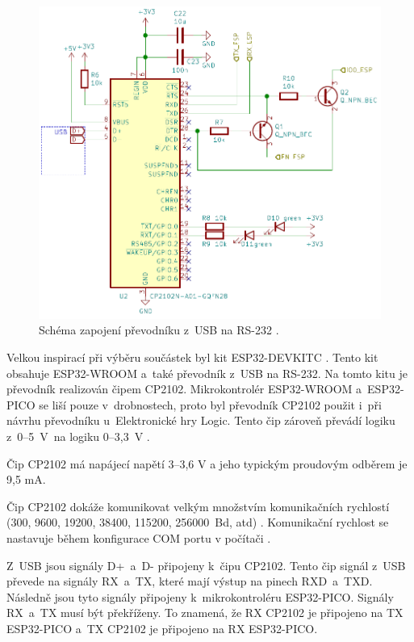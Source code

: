   \begin{figure}[!h]
    \begin{center}
      \includegraphics[scale=0.55]{obrazky/CP2102_schema.png}
    \end{center}
    \caption[Schéma zapojení převodníku z~USB na RS-232 \cite{Devkit_schema}]{Schéma zapojení převodníku z~USB na RS-232 \cite{Devkit_schema}.}
  \end{figure}

  Velkou inspirací při výběru součástek byl kit ESP32-DEVKITC \cite{Devkit_schema}. Tento kit obsahuje ESP32-WROOM a~také převodník
  z~USB na RS-232. Na tomto kitu je převodník realizován čipem CP2102. Mikrokontrolér ESP32-WROOM a~ESP32-PICO se liší pouze v~drobnostech, 
  proto byl převodník CP2102 použit i~při návrhu převodníku u~Elektronické hry Logic.  Tento čip zároveň převádí logiku 
  z~0--5~V~na logiku 0--3,3~V \cite{CP2102_datasheet}. 

 Čip CP2102 má napájecí napětí 3--3,6 V a jeho typickým proudovým odběrem je 9,5 mA.

  Čip CP2102 dokáže komunikovat velkým množstvím komunikačních rychlostí (300, 9600, 19200, 38400, 115200, 256000~Bd, atd) 
  \cite{CP2102_datasheet}. Komunikační rychlost se nastavuje během konfigurace COM portu v počítači \cite{CP2102_datasheet}.

  Z~USB jsou signály D+~a~D- připojeny k~čipu CP2102. Tento čip signál z~USB převede na signály RX~a~TX, které mají výstup 
  na pinech RXD~a~TXD. Následně jsou tyto signály připojeny k~mikrokontroléru ESP32-PICO. Signály RX~a~TX musí být překříženy. To znamená, že RX CP2102
  je připojeno na TX ESP32-PICO a~TX CP2102 je připojeno na RX ESP32-PICO. 

